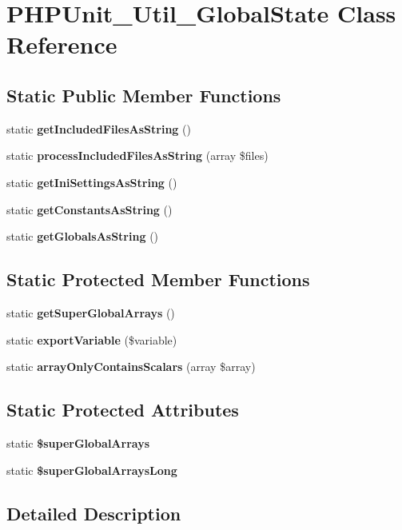 \section{P\+H\+P\+Unit\+\_\+\+Util\+\_\+\+Global\+State Class Reference}
\label{class_p_h_p_unit___util___global_state}
\subsection*{Static Public Member Functions}
\begin{DoxyCompactItemize}
\item 
static {\bf get\+Included\+Files\+As\+String} ()
\item 
static {\bf process\+Included\+Files\+As\+String} (array \$files)
\item 
static {\bf get\+Ini\+Settings\+As\+String} ()
\item 
static {\bf get\+Constants\+As\+String} ()
\item 
static {\bf get\+Globals\+As\+String} ()
\end{DoxyCompactItemize}
\subsection*{Static Protected Member Functions}
\begin{DoxyCompactItemize}
\item 
static {\bf get\+Super\+Global\+Arrays} ()
\item 
static {\bf export\+Variable} (\$variable)
\item 
static {\bf array\+Only\+Contains\+Scalars} (array \$array)
\end{DoxyCompactItemize}
\subsection*{Static Protected Attributes}
\begin{DoxyCompactItemize}
\item 
static {\bf \$super\+Global\+Arrays}
\item 
static {\bf \$super\+Global\+Arrays\+Long}
\end{DoxyCompactItemize}


\subsection{Detailed Description}


